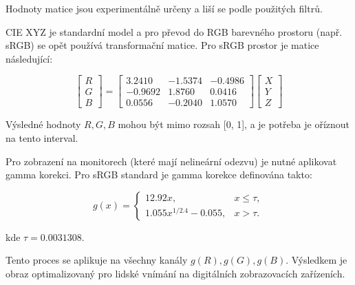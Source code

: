 \documentclass[a4paper,11pt,twocolumn]{article}
\begin{document}
            Hodnoty matice jsou experimentálně určeny a liší se podle použitých filtrů.

            CIE XYZ je standardní model a pro převod do RGB barevného prostoru (např. sRGB) se opět používá transformační matice. Pro sRGB prostor je matice následující:

            \begin{equation}
                \begin{bmatrix}
                    R \\
                    G \\
                    B
                \end{bmatrix}
                =
                \begin{bmatrix}
                    3.2410 & -1.5374 & -0.4986 \\
                    -0.9692 & 1.8760 & 0.0416 \\
                    0.0556 & -0.2040 & 1.0570
                \end{bmatrix}
                \begin{bmatrix}
                    X \\
                    Y \\
                    Z
                \end{bmatrix}
                \label{xyz_rgb}
            \end{equation}

            Výsledné hodnoty $R, G, B$ mohou být mimo rozsah [0, 1], a je potřeba je oříznout na tento interval.

            Pro zobrazení na monitorech (které mají nelineární odezvu) je nutné aplikovat gamma korekci. Pro sRGB standard je gamma korekce definována takto:

            \begin{equation}
                g(x) =
                \begin{cases} 
                    12.92x, & x \leq \tau, \\
                    1.055x^{1/2.4}-0.055, & x > \tau.
                \end{cases}
                \label{gamma}
            \end{equation}
            
            kde $\tau = 0.0031308$.

            Tento proces se aplikuje na všechny kanály $g(R), g(G), g(B)$.  Výsledkem je obraz optimalizovaný pro lidské vnímání na digitálních zobrazovacích zařízeních.
        
\end{document}
